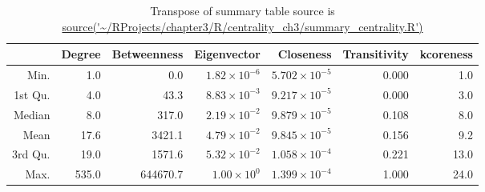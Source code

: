 
\begin{table}[ht]
\centering
\begin{tabular}{rrrrrrr}
  \toprule
 & Degree & Betweenness & Eigenvector & Closeness & Transitivity & kcoreness \\ 
  \midrule
Min. & 1.0 & 0.0 & $1.82 \times 10^{-6}$ & $5.702 \times 10^{-5}$ & 0.000 & 1.0 \\ 
  1st Qu. & 4.0 & 43.3 & $8.83 \times 10^{-3}$ & $9.217 \times 10^{-5}$ & 0.000 & 3.0 \\ 
  Median & 8.0 & 317.0 & $2.19 \times 10^{-2}$ & $9.879 \times 10^{-5}$ & 0.108 & 8.0 \\ 
  Mean & 17.6 & 3421.1 & $4.79 \times 10^{-2}$ & $9.845 \times 10^{-5}$ & 0.156 & 9.2 \\ 
  3rd Qu. & 19.0 & 1571.6 & $5.32 \times 10^{-2}$ & $1.058 \times 10^{-4}$ & 0.221 & 13.0 \\ 
  Max. & 535.0 & 644670.7 & $1.00 \times 10^{0}$ & $1.399 \times 10^{-4}$ & 1.000 & 24.0 \\ 
   \bottomrule
\end{tabular}
\caption{Transpose of summary table source is \url{source('~/RProjects/chapter3/R/centrality_ch3/summary_centrality.R')}}
\end{table}



   









